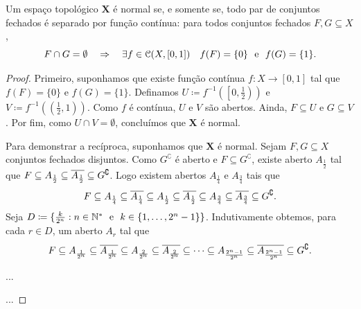 \begin{lema}[Urysohn]
	Um espaço topológico $\bm X$ é normal se, e somente se, todo par de conjuntos fechados é separado por função contínua: para todos conjuntos fechados $F,G \subseteq X$,
	\begin{equation*}
	F \cap G = \emptyset \quad \Rightarrow \quad \exists f \in \mathcal{C}(X,[0,1]) \quad f(F)=\{0\} \text{\ \ e\ \ } f(G)=\{1\}.
	\end{equation*}
\end{lema}
\begin{proof}
	Primeiro, suponhamos que existe função contínua $f:X \to [0,1]$ tal que $f(F)= \{0\}$ e $f(G)=\{1\}$. Definamos $U \coloneqq f^{-1}(\left[0,\frac{1}{2}\right))$ e $V \coloneqq f^{-1}((\frac{1}{2},1))$. Como $f$ é contínua, $U$ e $V$ são abertos. Ainda, $F \subseteq U$ e $G \subseteq V$. Por fim, como $U \cap V = \emptyset$, concluímos que $\bm X$ é normal.

	Para demonstrar a recíproca, suponhamos que $\bm X$ é normal. Sejam $F,G \subseteq X$ conjuntos fechados disjuntos. Como $G^\complement$ é aberto e $F \subseteq G^\complement$, existe aberto $A_{\frac{1}{2}}$ tal que $F \subseteq A_{\frac{1}{2}} \subseteq \overline{A_{\frac{1}{2}}} \subseteq G^\complement$. Logo existem abertos $A_{\frac{1}{4}}$ e $A_{\frac{3}{4}}$ tais que
	\begin{equation*}
	F \subseteq A_{\frac{1}{4}} \subseteq \overline{A_{\frac{1}{4}}} \subseteq A_{\frac{1}{2}} \subseteq \overline{A_{\frac{1}{2}}} \subseteq A_{\frac{3}{4}} \subseteq \overline{A_{\frac{3}{4}}} \subseteq G^\complement.
	\end{equation*}
Seja $D \coloneqq \{\frac{k}{2^n}:n \in \N^* \e k \in \{1,\ldots,2^n-1\}\}$. Indutivamente obtemos, para cada $r \in D$, um aberto $A_r$ tal que
	\begin{equation*}
	F \subseteq A_{\frac{1}{2^n}} \subseteq \overline{A_{\frac{1}{2^n}}} \subseteq A_{\frac{2}{2^n}} \subseteq \overline{A_{\frac{2}{2^n}}}\subseteq \cdots \subseteq A_{\frac{2^n-1}{2^n}} \subseteq \overline{A_{\frac{2^n-1}{2^n}}} \subseteq G^\complement.
	\end{equation*}
	
	...
	
	...
\end{proof}

















